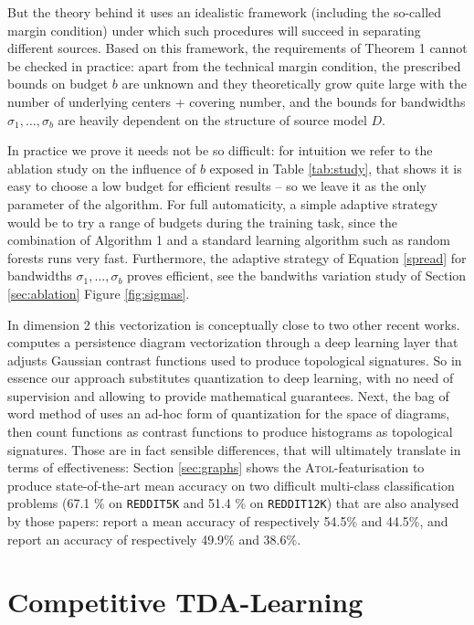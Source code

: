 \documentclass[twoside]{article}
\begin{document}
But the theory behind it uses an idealistic framework (including the so-called margin condition) under which such procedures will succeed in separating different sources. Based on this framework, the requirements of Theorem 1 cannot be checked in practice: apart from the technical margin condition, the prescribed bounds on budget $b$ are unknown and they theoretically grow quite large with the number of underlying centers + covering number, and the bounds for bandwidths $\sigma_1, \hdots, \sigma_b$ are heavily dependent on the structure of source model $D$.

In practice we prove it needs not be so difficult: for intuition we refer to the ablation study on the influence of $b$ exposed in Table \ref{tab:study}, that shows it is easy to choose a low budget for efficient results \--- so we leave it as the only parameter of the algorithm. For full automaticity, a simple adaptive strategy would be to try a range of budgets during the training task, since the combination of Algorithm 1 and a standard learning algorithm such as random forests runs very fast. Furthermore, the adaptive strategy of Equation \eqref{spread} for bandwidths $\sigma_1, \hdots, \sigma_b$ proves efficient, see the bandwiths variation study of Section \ref{sec:ablation} Figure \ref{fig:sigmas}.

In dimension 2 this vectorization is conceptually close to two other recent works. \cite{hofer2017deep} computes a persistence diagram vectorization through a deep learning layer that adjusts Gaussian contrast functions used to produce topological signatures. So in essence our approach substitutes quantization to deep learning, with no need of supervision and allowing to provide mathematical guarantees. Next, the bag of word method of \cite{zelinski2019} uses an ad-hoc form of quantization for the space of diagrams, then count functions as contrast functions to produce histograms as topological signatures. Those are in fact sensible differences, that will ultimately translate in terms of effectiveness: Section \ref{sec:graphs} shows the \textsc{Atol}-featurisation to produce state-of-the-art mean accuracy on two difficult multi-class classification problems (67.1 \% on \texttt{REDDIT5K} and 51.4 \% on \texttt{REDDIT12K}) that are also analysed by those papers: \cite{hofer2017deep} report a mean accuracy of respectively 54.5\% and 44.5\%, and \cite{zelinski2019} report an accuracy of respectively 49.9\% and 38.6\%.



\section{Competitive TDA-Learning} \label{sec:applications}
\end{document}
